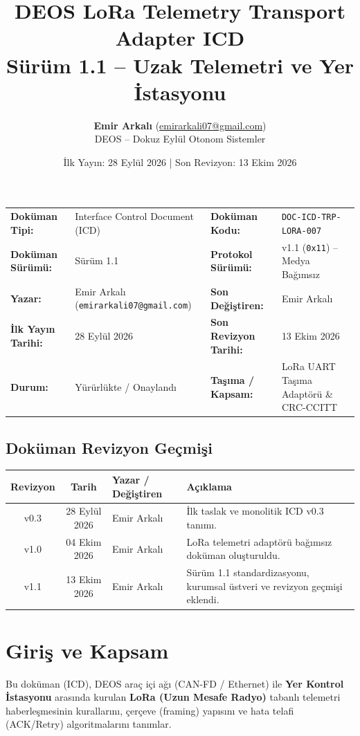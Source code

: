 \documentclass[a4paper,10pt]{article}
\title{\textbf{DEOS LoRa Telemetry Transport Adapter ICD}\\
\large Sürüm 1.1 -- Uzak Telemetri ve Yer İstasyonu}
\author{\textbf{Emir Arkalı} (\href{mailto:emirarkali07@gmail.com}{emirarkali07@gmail.com})\\DEOS -- Dokuz Eylül Otonom Sistemler}
\date{İlk Yayın: 28 Eylül 2026 \quad | \quad Son Revizyon: 13 Ekim 2026}
\newcommand{\hex}[1]{\texttt{0x#1}}
\newcommand{\code}[1]{\texttt{#1}}
\begin{document}
\maketitle

\begin{center}
\small
\begin{tabularx}{\textwidth}{ll lX}
\toprule
\textbf{Doküman Tipi:} & Interface Control Document (ICD) & \textbf{Doküman Kodu:} & \code{DOC-ICD-TRP-LORA-007} \\
\textbf{Doküman Sürümü:} & Sürüm 1.1 & \textbf{Protokol Sürümü:} & v1.1 (\hex{11}) -- Medya Bağımsız \\
\textbf{Yazar:} & Emir Arkalı (\texttt{emirarkali07@gmail.com}) & \textbf{Son Değiştiren:} & Emir Arkalı \\
\textbf{İlk Yayın Tarihi:} & 28 Eylül 2026 & \textbf{Son Revizyon Tarihi:} & 13 Ekim 2026 \\
\textbf{Durum:} & Yürürlükte / Onaylandı & \textbf{Taşıma / Kapsam:} & LoRa UART Taşıma Adaptörü \& CRC-CCITT \\
\bottomrule
\end{tabularx}
\end{center}

\subsection*{Doküman Revizyon Geçmişi}
\begin{center}
\small
\begin{tabularx}{\textwidth}{c c l X}
\toprule
\textbf{Revizyon} & \textbf{Tarih} & \textbf{Yazar / Değiştiren} & \textbf{Açıklama} \\
\midrule
v0.3 & 28 Eylül 2026 & Emir Arkalı & İlk taslak ve monolitik ICD v0.3 tanımı. \\
v1.0 & 04 Ekim 2026 & Emir Arkalı & LoRa telemetri adaptörü bağımsız doküman oluşturuldu. \\
v1.1 & 13 Ekim 2026 & Emir Arkalı & Sürüm 1.1 standardizasyonu, kurumsal üstveri ve revizyon geçmişi eklendi. \\
\bottomrule
\end{tabularx}
\end{center}
\vspace{0.8em}

\section{Giriş ve Kapsam}
Bu doküman (ICD), DEOS araç içi ağı (CAN-FD / Ethernet) ile \textbf{Yer Kontrol İstasyonu} arasında kurulan \textbf{LoRa (Uzun Mesafe Radyo)} tabanlı telemetri haberleşmesinin kurallarını, çerçeve (framing) yapısını ve hata telafi (ACK/Retry) algoritmalarını tanımlar.
\end{document}
